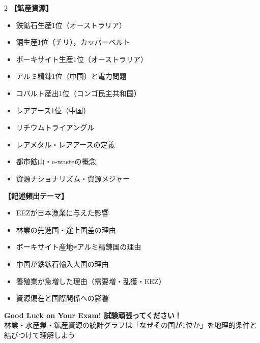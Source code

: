 \documentclass[a4paper,11pt]{article}
\begin{document}
\begin{tcolorbox}[sectionbox, title={■ 最終確認チェックリスト}]
\begin{multicols}{2}
\textbf{【鉱産資源】}
\begin{itemize}[leftmargin=1em, label=\( \square \)]
  \item 鉄鉱石生産1位（オーストラリア）
  \item 銅生産1位（チリ），カッパーベルト
  \item ボーキサイト生産1位（オーストラリア）
  \item アルミ精錬1位（中国）と電力問題
  \item コバルト産出1位（コンゴ民主共和国）
  \item レアアース1位（中国）
  \item リチウムトライアングル
  \item レアメタル・レアアースの定義
  \item 都市鉱山・e-wasteの概念
  \item 資源ナショナリズム・資源メジャー
\end{itemize}

\columnbreak

\textbf{【記述頻出テーマ】}
\begin{itemize}[leftmargin=1em, label=\( \square \)]
  \item EEZが日本漁業に与えた影響
  \item 林業の先進国・途上国差の理由
  \item ボーキサイト産地≠アルミ精錬国の理由
  \item 中国が鉄鉱石輸入大国の理由
  \item 養殖業が急増した理由（需要増・乱獲・EEZ）
  \item 資源偏在と国際関係への影響
\end{itemize}
\end{multicols}
\end{tcolorbox}

\vspace{4mm}

\begin{center}
\begin{tcolorbox}[
  enhanced,
  colback=maingreen!10,
  colframe=maingreen,
  width=0.9\textwidth,
  arc=5mm,
]
\begin{center}
{\large\sffamily\bfseries\color{maingreen}Good Luck on Your Exam! 試験頑張ってください！}\\[2pt]
{\small 林業・水産業・鉱産資源の統計グラフは「なぜその国が1位か」を地理的条件と結びつけて理解しよう}
\end{center}
\end{tcolorbox}
\end{center}
\end{document}
